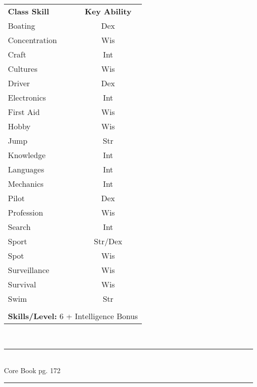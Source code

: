 \begin{table}[htb]
\raggedright
\begin{tabular}{l c}
\textbf{Class Skill} & \textbf{Key Ability}\\

Boating & Dex\\
Concentration & Wis\\
Craft & Int\\
Cultures & Wis\\
Driver & Dex\\
Electronics & Int\\
First Aid & Wis\\
Hobby & Wis\\
Jump & Str\\
Knowledge & Int\\
Languages & Int\\
Mechanics & Int\\
Pilot & Dex\\
Profession & Wis\\
Search & Int\\
Sport & Str/Dex\\
Spot & Wis\\
Surveillance & Wis\\
Survival & Wis\\
Swim & Str\\



\multicolumn{2}{l}{\cellcolor{white}}\\
\multicolumn{2}{l}{\cellcolor{white}\textbf{Skills/Level:} 6 + Intelligence Bonus}\\
\end{tabular}
\end{table}

\setlength{\intextsep}{14.0pt plus 4.0pt minus 4.0pt}

\vspace*{3cm}

\vspace*{\fill}

\begin{center}
\textsc{\Large}\\[0.25cm]
\rule{\linewidth}{0.5mm}\\[0.6cm]
\fontsize{30}{30} \selectfont Core Book pg. 172\\
\rule{\linewidth}{0.5mm}\\[0.6cm]
\vfill
\end{center}

\pagebreak



